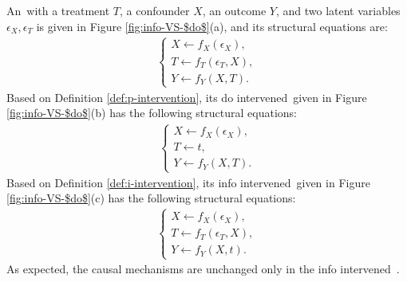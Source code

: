 \begin{Eg}
	\label{eg1}
	An \SCM\,with  
	a treatment $T$, a confounder $X$, an outcome $Y$, 
	and two latent variables $\epsilon_X, \epsilon_T$ is given in Figure \ref{fig:info-VS-$do$}(a), and its structural equations are:
	$$
	\begin{aligned}
	\begin{cases}
	X \leftarrow f_X(\epsilon_X),  \\
	T \leftarrow f_T(\epsilon_T, X), \\
	Y \leftarrow f_Y(X, T).
	\end{cases}
	\end{aligned}
	$$    
	Based on Definition \ref{def:p-intervention}, its 
	do intervened \SCM\,given in Figure \ref{fig:info-VS-$do$}(b) has the following structural equations: 
	$$
	\begin{aligned}
	\begin{cases}
	X \leftarrow f_X(\epsilon_X),  \\
	T \leftarrow t, \\
	Y \leftarrow f_Y(X, T).
	\end{cases}
	\end{aligned}
	$$    	
	Based on Definition \ref{def:i-intervention}, its info intervened \SCM\,given in Figure \ref{fig:info-VS-$do$}(c) has the following structural equations:
	$$
	\begin{aligned}
	\begin{cases}
	X \leftarrow f_X(\epsilon_X),  \\
	T \leftarrow f_T(\epsilon_T, X), \\
	Y \leftarrow f_Y(X, t). 
	\end{cases}
	\end{aligned}
	$$ 
As expected, the causal mechanisms are unchanged only in the info intervened \SCM\,.
\end{Eg}

